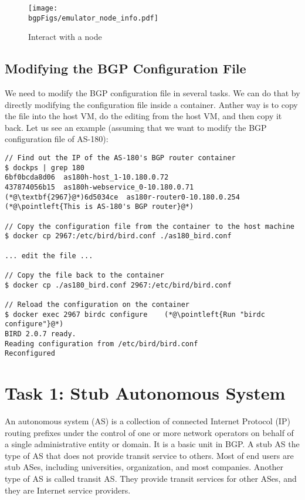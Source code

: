 \begin{figure}[htb]
  \begin{center}
    \texttt{[image: \\bgpFigs/emulator\_node\_info.pdf]}
  \end{center}
  \caption{Interact with a node}
  \label{bgp:fig:node-info}
\end{figure}
 

\subsection{Modifying the BGP Configuration File} 

We need to modify the BGP configuration file in several tasks.
We can do that by directly modifying the configuration file
inside a container. Anther way is to copy the file into the host VM,
do the editing from the host VM, and then copy it back. Let us 
see an example (assuming that we want to modify the BGP configuration
file of AS-180):

\begin{lstlisting}
// Find out the IP of the AS-180's BGP router container
$ dockps | grep 180
6bf0bcda8d06  as180h-host_1-10.180.0.72
437874056b15  as180h-webservice_0-10.180.0.71
(*@\textbf{2967}@*)6d5034ce  as180r-router0-10.180.0.254     (*@\pointleft{This is AS-180's BGP router}@*) 

// Copy the configuration file from the container to the host machine
$ docker cp 2967:/etc/bird/bird.conf ./as180_bird.conf

... edit the file ...

// Copy the file back to the container 
$ docker cp ./as180_bird.conf 2967:/etc/bird/bird.conf 

// Reload the configuration on the container
$ docker exec 2967 birdc configure    (*@\pointleft{Run "birdc configure"}@*) 
BIRD 2.0.7 ready.
Reading configuration from /etc/bird/bird.conf
Reconfigured
\end{lstlisting}
 



\section{Task 1: Stub Autonomous System} 

An autonomous system (AS) is a collection of connected Internet Protocol (IP) routing prefixes
under the control of one or more network operators on behalf of a single administrative entity
or domain. It is a basic unit in BGP. 
A stub AS the type of AS that does not provide transit service to others.
Most of end users are stub ASes, including universities, organization,
and most companies. Another type of AS is called transit AS. They
provide transit services for other ASes, and they 
are Internet service providers.  

